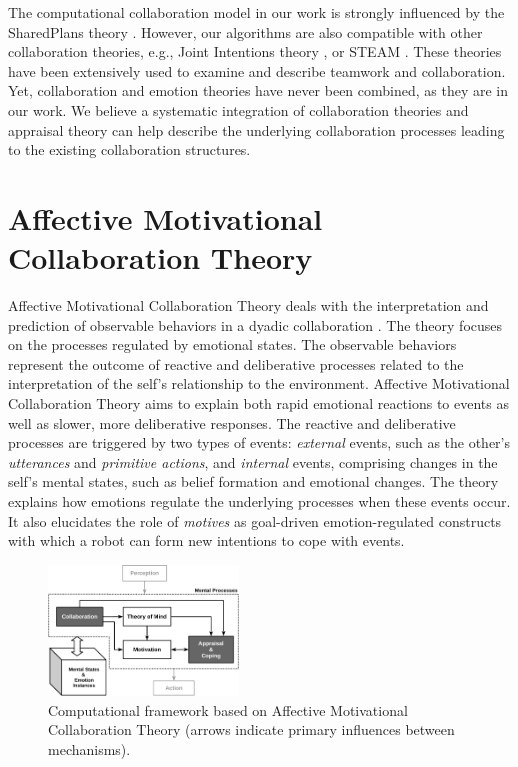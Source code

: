 \documentclass{article}
\begin{document}
The computational collaboration model in our work is strongly influenced by the
SharedPlans theory \cite{grosz:plans-discourse}. However, our algorithms are
also compatible with other collaboration theories, e.g., Joint Intentions theory
\cite{cohen:teamwork}, or STEAM \cite{tambe:flexible-teamwork}. These theories
have been extensively used to examine and describe teamwork and collaboration.
Yet, collaboration and emotion theories have never been combined, as they are in
our work. We believe a systematic integration of collaboration theories and
appraisal theory can help describe the underlying collaboration processes
leading to the existing collaboration structures.

\section{{\fontsize{11.85}{12}\selectfont Affective Motivational Collaboration
Theory}}

Affective Motivational Collaboration Theory deals with the interpretation and
prediction of observable behaviors in a dyadic collaboration
\cite{shayganfar:appraisal-short}. The theory focuses on the processes regulated
by emotional states. The observable behaviors represent the outcome of reactive
and deliberative processes related to the interpretation of the self's
relationship to the environment. Affective Motivational Collaboration Theory
aims to explain both rapid emotional reactions to events as well as slower, more
deliberative responses. The reactive and deliberative processes are triggered by
two types of events: \textit{external} events, such as the other's
\textit{utterances} and \textit{primitive actions}, and \textit{internal}
events, comprising changes in the self's mental states, such as belief formation
and emotional changes. The theory explains how emotions regulate the underlying
processes when these events occur. It also elucidates the role of
\textit{motives} as goal-driven emotion-regulated constructs with which a robot
can form new intentions to cope with events.

\vspace*{-3mm}
\begin{figure}[tbh]
  \centering
  \includegraphics[width=0.45\textwidth]{figure/theory-general-croped.pdf}
  \vspace*{-3mm}
  \caption{{\fontsize{9}{9}\selectfont Computational framework based on
  Affective Motivational Collaboration Theory (arrows indicate primary
  influences between mechanisms).}}
  \vspace*{-3mm}
  \label{fig:cpm}
\end{figure}
\end{document}

